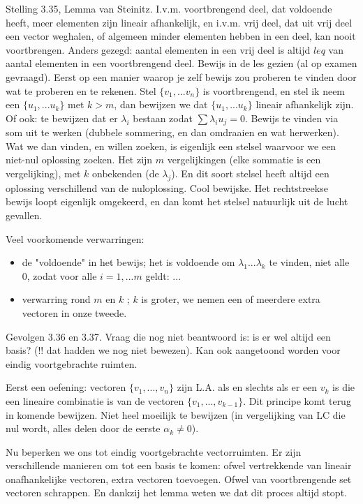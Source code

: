 \documentclass{article}
\begin{document}
Stelling 3.35, Lemma van Steinitz. I.v.m. voortbrengend deel, dat voldoende heeft, meer elementen zijn lineair afhankelijk, en i.v.m. vrij deel, dat uit vrij deel een vector weghalen, of algemeen minder elementen hebben in een deel, kan nooit voortbrengen. 
Anders gezegd: aantal elementen in een vrij deel is altijd $leq$ van aantal elementen in een voortbrengend deel. 
Bewijs in de les gezien (al op examen gevraagd). Eerst op een manier waarop je zelf bewijs zou proberen te vinden door wat te proberen en te rekenen. 
Stel $\{v_1, ... v_n \}$ is voortbrengend, en stel ik neem een $\{u_1, ... u_k \}$ met $k > m$, dan bewijzen we dat $\{u_1, ... u_k \}$ lineair afhankelijk zijn. Of ook: te bewijzen dat er $\lambda_i$ bestaan zodat $\sum \lambda_i u_j =0$. Bewijs te vinden via som uit te werken (dubbele sommering, en dan omdraaien en wat herwerken).  Wat we dan vinden, en willen zoeken, is eigenlijk een stelsel waarvoor we een niet-nul oplossing zoeken. Het zijn $m$ vergelijkingen (elke sommatie is een vergelijking), met $k$ onbekenden (de $\lambda_j$). En dit soort stelsel heeft altijd een oplossing verschillend van de nuloplossing. Cool bewijske. 
Het rechtstreekse bewijs loopt eigenlijk omgekeerd, en dan komt het stelsel natuurlijk uit de lucht gevallen. 

Veel voorkomende verwarringen: 
\begin{itemize}
    \item de "voldoende" in het bewijs; het is voldoende om $\lambda_1 ... \lambda_k$ te vinden, niet alle 0, zodat voor alle $i=1,...m$ geldt: ... 
    \item verwarring rond $m$ en $k$ ; $k$ is groter, we nemen een of meerdere extra vectoren in onze tweede. 
\end{itemize}


Gevolgen 3.36 en 3.37. Vraag die nog niet beantwoord is: is er wel altijd een basis? (!! dat hadden we nog niet bewezen).
Kan ook aangetoond worden voor eindig voortgebrachte ruimten. 

Eerst een oefening: vectoren $\{ v_1,...,v_n \}$ zijn L.A. als en slechts als er een $v_k$ is die een lineaire combinatie is van de vectoren $\{ v_1,...,v_{k-1} \}$. Dit principe komt terug in komende bewijzen. Niet heel moeilijk te bewijzen (in vergelijking van LC die nul wordt, alles delen door de eerste $\alpha_k \neq 0$). 

Nu beperken we ons tot eindig voortgebrachte vectorruimten. 
Er zijn verschillende manieren om tot een basis te komen: ofwel vertrekkende van lineair onafhankelijke vectoren, extra vectoren toevoegen. Ofwel van voortbrengende set vectoren schrappen. 
En dankzij het lemma weten we dat dit proces altijd stopt. 
\end{document}
